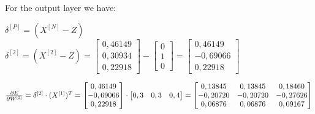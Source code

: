 \documentclass[12pt]{article}
\begin{document}
\begin{enumerate}[leftmargin=\labelsep, label=\textbf{\arabic*.)}]
\begin{itemize}
\begin{center}
                        For the output layer we have:
                        \vspace{0.5em}

                        $\delta^{[P]} = (X^{[N]} - Z)$ \hspace{2em}
                        $\delta^{[2]} = (X^{[2]} - Z) = \begin{bmatrix}
                                0,46149 \\
                                0,30934 \\
                                0,22918
                            \end{bmatrix} - \begin{bmatrix}
                                0 \\
                                1 \\
                                0
                            \end{bmatrix} = \begin{bmatrix}
                                0,46149  \\
                                -0,69066 \\
                                0,22918
                            \end{bmatrix}$

                        \vspace{0.5em}

                        $\pdv{E}{W^{[2]}} = \delta^{[2]} \cdot (X^{[1]})^{T} = \begin{bmatrix}
                                0,46149  \\
                                -0,69066 \\
                                0,22918
                            \end{bmatrix} \cdot \begin{bmatrix}
                                0,3 & 0,3 & 0,4
                            \end{bmatrix} = \begin{bmatrix}
                                0,13845  & 0,13845  & 0,18460  \\
                                -0,20720 & -0,20720 & -0,27626 \\
                                0,06876  & 0,06876  & 0,09167
                            \end{bmatrix}$
                        \vspace{0.25cm}


\end{center}
\end{itemize}
\end{enumerate}
\end{document}
